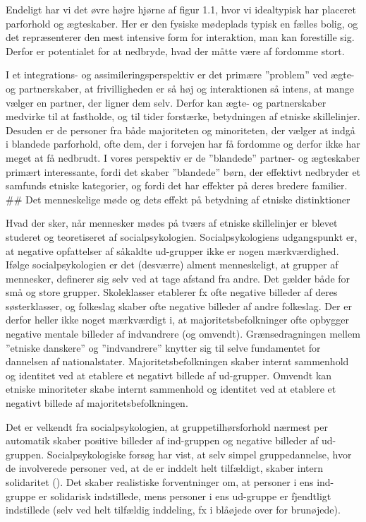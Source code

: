 \documentclass[
]{book}
\begin{document}
Endeligt har vi det øvre højre hjørne af figur 1.1, hvor vi idealtypisk har placeret parforhold og ægteskaber. Her er den fysiske mødeplads typisk en fælles bolig, og det repræsenterer den mest intensive form for interaktion, man kan forestille sig. Derfor er potentialet for at nedbryde, hvad der måtte være af fordomme stort.

I et integrations- og assimileringsperspektiv er det primære ''problem'' ved ægte- og partnerskaber, at frivilligheden er så høj og interaktionen så intens, at mange vælger en partner, der ligner dem selv. Derfor kan ægte- og partnerskaber medvirke til at fastholde, og til tider forstærke, betydningen af etniske skillelinjer. Desuden er de personer fra både majoriteten og minoriteten, der vælger at indgå i blandede parforhold, ofte dem, der i forvejen har få fordomme og derfor ikke har meget at få nedbrudt. I vores perspektiv er de ''blandede'' partner- og ægteskaber primært interessante, fordi det skaber ''blandede'' børn, der effektivt nedbryder et samfunds etniske kategorier, og fordi det har effekter på deres bredere familier.
\#\# Det menneskelige møde og dets effekt på betydning af etniske distinktioner

Hvad der sker, når mennesker mødes på tværs af etniske skillelinjer er blevet studeret og teoretiseret af socialpsykologien. Socialpsykologiens udgangspunkt er, at negative opfattelser af såkaldte ud-grupper ikke er nogen mærkværdighed. Ifølge socialpsykologien er det (desværre) alment menneskeligt, at grupper af mennesker, definerer sig selv ved at tage afstand fra andre. Det gælder både for små og store grupper. Skoleklasser etablerer fx ofte negative billeder af deres søsterklasser, og folkeslag skaber ofte negative billeder af andre folkeslag. Der er derfor heller ikke noget mærkværdigt i, at majoritetsbefolkninger ofte opbygger negative mentale billeder af indvandrere (og omvendt). Grænsedragningen mellem ''etniske danskere'' og ''indvandrere'' knytter sig til selve fundamentet for dannelsen af nationalstater. Majoritetsbefolkningen skaber internt sammenhold og identitet ved at etablere et negativt billede af ud-grupper. Omvendt kan etniske minoriteter skabe internt sammenhold og identitet ved at etablere et negativt billede af majoritetsbefolkningen.

Det er velkendt fra socialpsykologien, at gruppetilhørsforhold nærmest per automatik skaber positive billeder af ind-gruppen og negative billeder af ud-gruppen. Socialpsykologiske forsøg har vist, at selv simpel gruppedannelse, hvor de involverede personer ved, at de er inddelt helt tilfældigt, skaber intern solidaritet (). Det skaber realistiske forventninger om, at personer i ens ind-gruppe er solidarisk indstillede, mens personer i ens ud-gruppe er fjendtligt indstillede (selv ved helt tilfældig inddeling, fx i blåøjede over for brunøjede).
\end{document}

